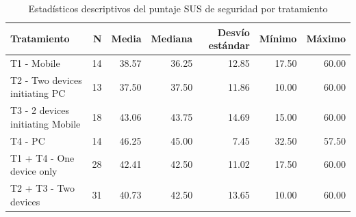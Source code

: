 \begin{table}
\caption{Estadísticos descriptivos del puntaje SUS de seguridad por tratamiento}
\label{tab:sus_seguridad_stats}
\begin{tabular}{lrrrrrr}
\toprule
Tratamiento & N & Media & Mediana & Desvío estándar & Mínimo & Máximo \\
\midrule
T1 - Mobile & 14 & 38.57 & 36.25 & 12.85 & 17.50 & 60.00 \\
T2 - Two devices initiating PC & 13 & 37.50 & 37.50 & 11.86 & 10.00 & 60.00 \\
T3 - 2 devices initiating Mobile & 18 & 43.06 & 43.75 & 14.69 & 15.00 & 60.00 \\
T4 - PC & 14 & 46.25 & 45.00 & 7.45 & 32.50 & 57.50 \\
T1 + T4 - One device only & 28 & 42.41 & 42.50 & 11.02 & 17.50 & 60.00 \\
T2 + T3 - Two devices & 31 & 40.73 & 42.50 & 13.65 & 10.00 & 60.00 \\
\bottomrule
\end{tabular}
\end{table}
